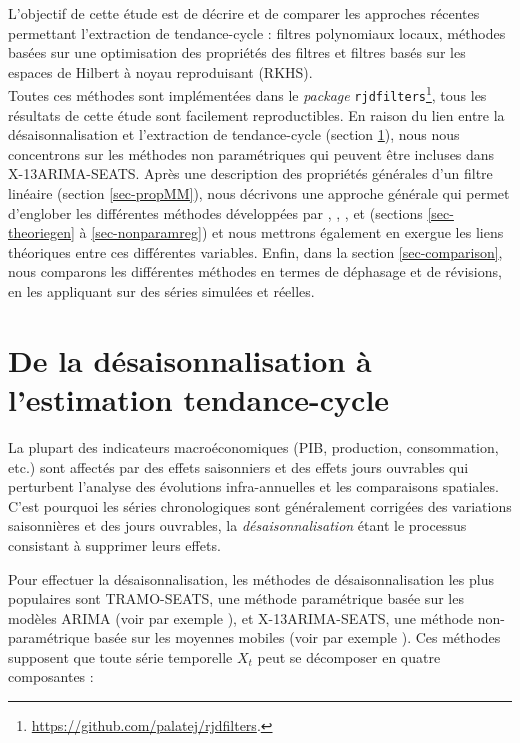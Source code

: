 \documentclass[
  12pt,
  french,
  12pt,a4paper]{article}
\newcommand\1{\mathds{1}}
\begin{document}
L'objectif de cette étude est de décrire et de comparer les approches récentes permettant l'extraction de tendance-cycle : filtres polynomiaux locaux, méthodes basées sur une optimisation des propriétés des filtres et filtres basés sur les espaces de Hilbert à noyau reproduisant (RKHS).\\
Toutes ces méthodes sont implémentées dans le \emph{package}  \texttt{rjdfilters}\footnote{\url{https://github.com/palatej/rjdfilters}.}, tous les résultats de cette étude sont facilement reproductibles.
En raison du lien entre la désaisonnalisation et l'extraction de tendance-cycle (section \ref{sec-SAtoTCE}), nous nous concentrons sur les méthodes non paramétriques qui peuvent être incluses dans X-13ARIMA-SEATS.
Après une description des propriétés générales d'un filtre linéaire (section \ref{sec-propMM}), nous décrivons une approche générale qui permet d'englober les différentes méthodes développées par \textcite{proietti2008}, \textcite{GrayThomson1996}, \textcite{ch15HBSA}, \textcite{trilemmaWMR2019} et \textcite{dagumbianconcini2008} (sections \ref{sec-theoriegen} à \ref{sec-nonparamreg}) et nous mettrons également en exergue les liens théoriques entre ces différentes variables.
Enfin, dans la section \ref{sec-comparison}, nous comparons les différentes méthodes en termes de déphasage et de révisions, en les appliquant sur des séries simulées et réelles.

\newpage

\hypertarget{sec-SAtoTCE}{%
\section{De la désaisonnalisation à l'estimation tendance-cycle}\label{sec-SAtoTCE}}

La plupart des indicateurs macroéconomiques (PIB, production, consommation, etc.) sont affectés par des effets saisonniers et des effets jours ouvrables qui perturbent l'analyse des évolutions infra-annuelles et les comparaisons spatiales.
C'est pourquoi les séries chronologiques sont généralement corrigées des variations saisonnières et des jours ouvrables, la \emph{désaisonnalisation} étant le processus consistant à supprimer leurs effets.

Pour effectuer la désaisonnalisation, les méthodes de désaisonnalisation les plus populaires sont TRAMO-SEATS, une méthode paramétrique basée sur les modèles ARIMA (voir par exemple \textcite{maravall2004program}), et X-13ARIMA-SEATS, une méthode non-paramétrique basée sur les moyennes mobiles (voir par exemple \textcite{ladiray2011seasonal}).
Ces méthodes supposent que toute série temporelle \(X_t\) peut se décomposer en quatre composantes :
\end{document}
